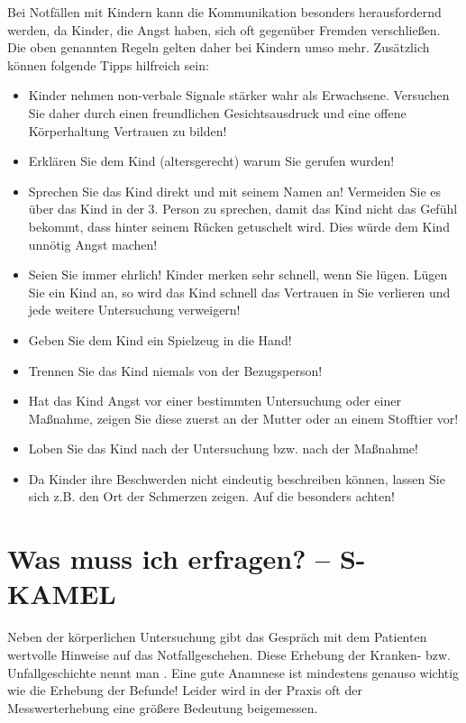 { Bei Notfällen mit Kindern kann die Kommunikation besonders herausfordernd
werden, da Kinder, die Angst haben, sich oft gegenüber Fremden verschließen. Die
oben genannten Regeln gelten daher bei Kindern umso mehr. Zusätzlich können
folgende Tipps hilfreich sein:

\begin{itemize}
  \item Kinder nehmen non-verbale Signale stärker wahr als Erwachsene.
  Versuchen Sie daher durch einen freundlichen Gesichtsausdruck und eine
  offene Körperhaltung Vertrauen zu bilden!
  \item Erklären Sie dem Kind (altersgerecht) warum Sie gerufen wurden!
  \item Sprechen Sie das Kind direkt und mit seinem Namen an! Vermeiden  Sie
  es über das Kind in der 3. Person zu sprechen, damit das Kind nicht das
  Gefühl  bekommt, dass hinter seinem Rücken getuschelt wird. Dies würde dem
  Kind unnötig Angst machen!
  \item Seien Sie immer ehrlich! Kinder merken sehr schnell, wenn Sie lügen.
  Lügen  Sie ein Kind an, so wird das Kind schnell das Vertrauen in Sie
  verlieren  und jede weitere Untersuchung verweigern!
  \item Geben Sie dem Kind ein Spielzeug in die Hand!
  \item Trennen Sie das Kind niemals von der Bezugsperson!
  \item Hat das Kind Angst vor einer bestimmten Untersuchung oder einer
  Maßnahme, zeigen Sie diese zuerst an der Mutter oder an einem Stofftier vor!
  \item Loben Sie das Kind nach der Untersuchung bzw. nach der Maßnahme!
  \item Da Kinder ihre Beschwerden nicht eindeutig beschreiben können, lassen
  Sie sich z.B. den Ort der Schmerzen zeigen. Auf die 
  besonders achten!
\end{itemize}
}{
{\SymbolText}
}


\section{Was muss ich erfragen? -- S-KAMEL}


Neben der körperlichen Untersuchung gibt das Gespr\"ach mit dem Patienten
wertvolle Hinweise auf das Notfallgeschehen. Diese Erhebung der Kranken- bzw.
Unfallgeschichte nennt man . Eine gute Anamnese ist mindestens
genauso wichtig wie die Erhebung der Befunde! Leider wird in der Praxis oft der
Messwerterhebung eine größere Bedeutung beigemessen.

